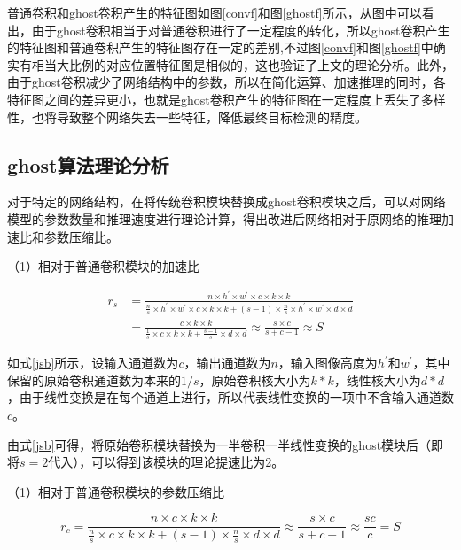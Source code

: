 普通卷积和ghost卷积产生的特征图如图\ref{convf}和图\ref{ghostf}所示，从图中可以看出，由于ghost卷积相当于对普通卷积进行了一定程度的转化，所以ghost卷积产生的特征图和普通卷积产生的特征图存在一定的差别,不过图\ref{convf}和图\ref{ghostf}中确实有相当大比例的对应位置特征图是相似的，这也验证了上文的理论分析。此外，由于ghost卷积减少了网络结构中的参数，所以在简化运算、加速推理的同时，各特征图之间的差异更小，也就是ghost卷积产生的特征图在一定程度上丢失了多样性，也将导致整个网络失去一些特征，降低最终目标检测的精度。

\subsection{ghost算法理论分析}
对于特定的网络结构，在将传统卷积模块替换成ghost卷积模块之后，可以对网络模型的参数数量和推理速度进行理论计算，得出改进后网络相对于原网络的推理加速比和参数压缩比。

（1）相对于普通卷积模块的加速比

\begin{equation}
    \begin{aligned}
    r_{s} &=\frac{n \times h^{\prime} \times w^{\prime} \times c \times k \times k}{\frac{n}{s} \times h^{\prime} \times w^{\prime} \times c \times k \times k+(s-1) \times \frac{n}{s} \times h^{\prime} \times w^{\prime} \times d \times d} \\
    &=\frac{c \times k \times k}{\frac{1}{s} \times c \times k \times k+\frac{s-1}{s} \times d \times d} \approx \frac{s \times c}{s+c-1} \approx S
    \end{aligned}
    \label{jsb}
\end{equation}

如式\ref{jsb}所示，设输入通道数为$c$，输出通道数为$n$，输入图像高度为$h^{\prime}$和$w^{\prime}$，其中保留的原始卷积通道数为本来的$1/s$，原始卷积核大小为$k*k$，线性核大小为$d*d$，由于线性变换是在每个通道上进行，所以代表线性变换的一项中不含输入通道数$c$。

由式\ref{jsb}可得，将原始卷积模块替换为一半卷积一半线性变换的ghost模块后（即将$s=2$代入），可以得到该模块的理论提速比为2。

（1）相对于普通卷积模块的参数压缩比

\begin{equation}
    r_{c}=\frac{n \times c \times k \times k}{\frac{n}{s} \times c \times k \times k+(s-1) \times \frac{n}{s} \times d \times d} \approx \frac{s \times c}{s+c-1} \approx \frac{s c}{c}=S
    \label{csys}
\end{equation}

